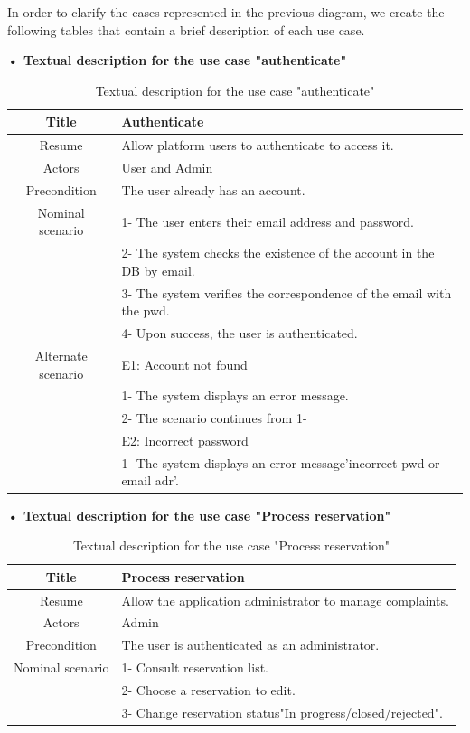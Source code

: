 In order to clarify the cases represented in the previous diagram, we create the following tables that contain a brief description of each use case. 
    
\textbf{• \textbf{Textual description for the use case "authenticate" }}

\begin{table}
    \centering
    \begin{tabular}{|c|l|} \hline 
         Title& Authenticate\\ \hline 
         Resume& Allow platform users to authenticate to access it.\\ \hline 
         Actors& User and Admin\\ \hline 
         Precondition&The user already has an account.\\\hline \hline 
         Nominal scenario& 1- The user enters their email address and password.\\ \hline 
 &2- The system checks the existence of the account in the DB by email.\\ \hline 
 &3- The system verifies the correspondence of the email with the pwd.\\ \hline 
 &4- Upon success, the user is authenticated.\\\hline \hline 
         Alternate scenario& E1: Account not found\\ \hline 
 &1- The system displays an error message.\\
 &2- The scenario continues from 1-\\\hline \hline 
 &E2: Incorrect password\\ \hline 
 &1- The system displays an error message'incorrect pwd or email adr'.\\ \hline
    \end{tabular}
    \caption{Textual description for the use case "authenticate"}
    \label{Textual description for the use case "authenticate"}
\end{table}

\textbf{• \textbf{Textual description for the use case "Process reservation" }}

\begin{table}
    \centering
    \begin{tabular}{|c|l|} \hline 
         Title& Process reservation\\ \hline 
         Resume& Allow the application administrator to manage complaints.\\ \hline 
         Actors& Admin\\ \hline 
         Precondition&The user is authenticated as an administrator.\\\hline \hline 
         Nominal scenario& 1- Consult reservation list.\\ \hline 
 &2- Choose a reservation to edit.\\ \hline 
 &3- Change reservation status"In progress/closed/rejected".\\\hline
    \end{tabular}
    \caption{Textual description for the use case "Process reservation" }
    \label{Textual description for the use case "Process reservation" }
\end{table}

